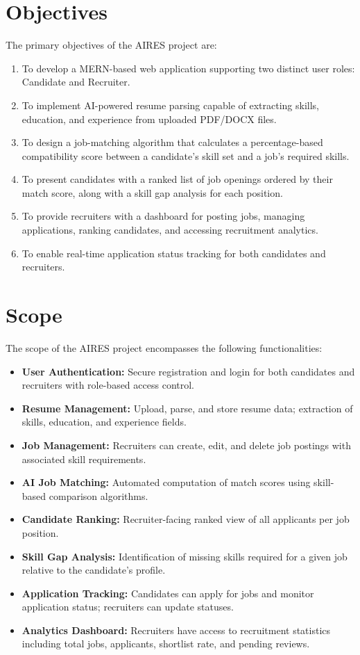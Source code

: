 \section{Objectives}
The primary objectives of the AIRES project are:
\begin{enumerate}
    \item To develop a MERN-based web application supporting two distinct user roles: Candidate and Recruiter.
    \item To implement AI-powered resume parsing capable of extracting skills, education, and experience from uploaded PDF/DOCX files.
    \item To design a job-matching algorithm that calculates a percentage-based compatibility score between a candidate's skill set and a job's required skills.
    \item To present candidates with a ranked list of job openings ordered by their match score, along with a skill gap analysis for each position.
    \item To provide recruiters with a dashboard for posting jobs, managing applications, ranking candidates, and accessing recruitment analytics.
    \item To enable real-time application status tracking for both candidates and recruiters.
\end{enumerate}

\section{Scope}
The scope of the AIRES project encompasses the following functionalities:
\begin{itemize}
    \item \textbf{User Authentication:} Secure registration and login for both candidates and recruiters with role-based access control.
    \item \textbf{Resume Management:} Upload, parse, and store resume data; extraction of skills, education, and experience fields.
    \item \textbf{Job Management:} Recruiters can create, edit, and delete job postings with associated skill requirements.
    \item \textbf{AI Job Matching:} Automated computation of match scores using skill-based comparison algorithms.
    \item \textbf{Candidate Ranking:} Recruiter-facing ranked view of all applicants per job position.
    \item \textbf{Skill Gap Analysis:} Identification of missing skills required for a given job relative to the candidate's profile.
    \item \textbf{Application Tracking:} Candidates can apply for jobs and monitor application status; recruiters can update statuses.
    \item \textbf{Analytics Dashboard:} Recruiters have access to recruitment statistics including total jobs, applicants, shortlist rate, and pending reviews.
\end{itemize}

